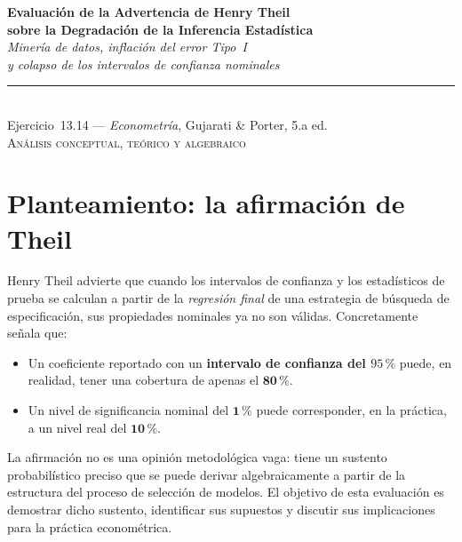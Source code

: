 \documentclass[12pt, letterpaper]{article}
\begin{document}
\begin{center}
  {\LARGE\bfseries Evaluación de la Advertencia de Henry Theil}\\[6pt]
  {\LARGE\bfseries sobre la Degradación de la Inferencia Estadística}\\[12pt]
  {\large\itshape Minería de datos, inflación del error Tipo~I}\\
  {\large\itshape y colapso de los intervalos de confianza nominales}\\[14pt]
  \rule{0.55\linewidth}{0.6pt}\\[8pt]
  {\normalsize Ejercicio~13.14 --- \textit{Econometría}, Gujarati \& Porter, 5.a ed.}\\[4pt]
  {\small\textsc{Análisis conceptual, teórico y algebraico}}
\end{center}

\vspace{10pt}

\section{Planteamiento: la afirmación de Theil}

Henry Theil advierte que cuando los intervalos de confianza y los
estadísticos de prueba se calculan a partir de la \emph{regresión final}
de una estrategia de búsqueda de especificación, sus propiedades nominales
ya no son válidas. Concretamente señala que:

\begin{itemize}[leftmargin=1.6cm]
  \item Un coeficiente reportado con un \textbf{intervalo de confianza del
    $95\,\%$} puede, en realidad, tener una cobertura de apenas el
    $\mathbf{80\,\%}$.
  \item Un nivel de significancia nominal del $\mathbf{1\,\%}$ puede
    corresponder, en la práctica, a un nivel real del $\mathbf{10\,\%}$.
\end{itemize}

La afirmación no es una opinión metodológica vaga: tiene un sustento
probabilístico preciso que se puede derivar algebraicamente a partir de
la estructura del proceso de selección de modelos. El objetivo de esta
evaluación es demostrar dicho sustento, identificar sus supuestos y
discutir sus implicaciones para la práctica econométrica.
\end{document}
